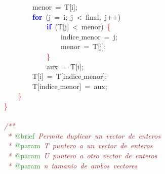 \mbox{}\ \ \ \ \ \ \ \ menor\ \textcolor{BrickRed}{=}\ T\textcolor{BrickRed}{[}i\textcolor{BrickRed}{];} \\
\mbox{}\ \ \ \ \ \ \ \ \textbf{\textcolor{Blue}{for}}\ \textcolor{BrickRed}{(}j\ \textcolor{BrickRed}{=}\ i\textcolor{BrickRed}{;}\ j\ \textcolor{BrickRed}{\textless{}}\ final\textcolor{BrickRed}{;}\ j\textcolor{BrickRed}{++)} \\
\mbox{}\ \ \ \ \ \ \ \ \ \ \ \ \textbf{\textcolor{Blue}{if}}\ \textcolor{BrickRed}{(}T\textcolor{BrickRed}{[}j\textcolor{BrickRed}{]}\ \textcolor{BrickRed}{\textless{}}\ menor\textcolor{BrickRed}{)}\ \textcolor{Red}{\{} \\
\mbox{}\ \ \ \ \ \ \ \ \ \ \ \ \ \ \ \ indice$\_$menor\ \textcolor{BrickRed}{=}\ j\textcolor{BrickRed}{;} \\
\mbox{}\ \ \ \ \ \ \ \ \ \ \ \ \ \ \ \ menor\ \textcolor{BrickRed}{=}\ T\textcolor{BrickRed}{[}j\textcolor{BrickRed}{];} \\
\mbox{}\ \ \ \ \ \ \ \ \ \ \ \ \textcolor{Red}{\}} \\
\mbox{}\ \ \ \ \ \ \ \ \ \ \ \ aux\ \textcolor{BrickRed}{=}\ T\textcolor{BrickRed}{[}i\textcolor{BrickRed}{];} \\
\mbox{}\ \ \ \ \ \ \ \ T\textcolor{BrickRed}{[}i\textcolor{BrickRed}{]}\ \textcolor{BrickRed}{=}\ T\textcolor{BrickRed}{[}indice$\_$menor\textcolor{BrickRed}{];} \\
\mbox{}\ \ \ \ \ \ \ \ T\textcolor{BrickRed}{[}indice$\_$menor\textcolor{BrickRed}{]}\ \textcolor{BrickRed}{=}\ aux\textcolor{BrickRed}{;} \\
\mbox{}\ \ \ \ \textcolor{Red}{\}} \\
\mbox{}\textcolor{Red}{\}} \\
\mbox{}\  \\
\mbox{}\textit{\textcolor{Brown}{/**}} \\
\mbox{}\textit{\textcolor{Brown}{\ *\ }}\textcolor{ForestGreen}{@brief}\textit{\textcolor{Brown}{\ Permite\ duplicar\ un\ vector\ de\ enteros}} \\
\mbox{}\textit{\textcolor{Brown}{\ *\ }}\textcolor{ForestGreen}{@param}\textit{\textcolor{Brown}{\ T\ puntero\ a\ un\ vector\ de\ enteros}} \\
\mbox{}\textit{\textcolor{Brown}{\ *\ }}\textcolor{ForestGreen}{@param}\textit{\textcolor{Brown}{\ U\ puntero\ a\ otro\ vector\ de\ enteros}} \\
\mbox{}\textit{\textcolor{Brown}{\ *\ }}\textcolor{ForestGreen}{@param}\textit{\textcolor{Brown}{\ n\ tamanio\ de\ ambos\ vectores}} \\
